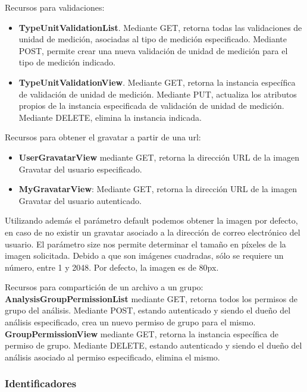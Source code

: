 Recursos para validaciones:

\begin{itemize}
	\item \textbf{TypeUnitValidationList}. Mediante GET, retorna todas las validaciones de unidad de medición, asociadas al tipo de medición especificado. Mediante POST, permite crear una nueva validación de unidad de medición para el tipo de medición indicado.
	\item \textbf{TypeUnitValidationView}. Mediante GET, retorna la instancia específica de validación de unidad de medición. Mediante PUT, actualiza los atributos propios de la instancia especificada de validación de unidad de medición. Mediante DELETE, elimina la instancia indicada.
	
	
\end{itemize}

Recursos para obtener el gravatar a partir de una url:

\begin{itemize}
	\item \textbf{UserGravatarView} mediante GET, retorna la dirección URL de la imagen Gravatar del usuario especificado.
    \item \textbf{MyGravatarView}: Mediante GET, retorna la dirección URL de la imagen Gravatar del usuario autenticado.
\end{itemize}

Utilizando además el parámetro default podemos obtener la imagen por defecto, en caso de no existir un gravatar asociado a la dirección de correo electrónico del usuario. El parámetro size nos permite determinar el tamaño en píxeles de la imagen solicitada. Debido a que son imágenes cuadradas, sólo se requiere un número, entre 1 y 2048. Por defecto, la imagen es de 80px.

Recursos para compartición de un archivo a un grupo:
    \textbf{AnalysisGroupPermissionList} mediante GET, retorna todos los permisos de grupo del análisis. Mediante POST, estando autenticado y siendo el dueño del análisis especificado, crea un nuevo permiso de grupo para el mismo.
    \textbf{GroupPermissionView} mediante GET, retorna la instancia específica de permiso de grupo. Mediante DELETE, estando autenticado y siendo el dueño del análisis asociado al permiso especificado, elimina el mismo.

\subsubsection{Identificadores}
    
